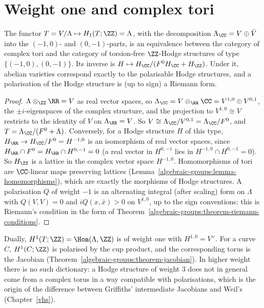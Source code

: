 \section{Weight one and complex tori}\label{hodge-structures:section-weight-one}

\begin{theorem}\label{hodge-structures:theorem-weight-one}
The functor $T = V/\Lambda \mapsto H_1(T; \ZZ) = \Lambda$, with the decomposition $\Lambda_\CC = V \oplus \bar V$ into the $(-1,0)$- and $(0,-1)$-parts, is an equivalence between the category
of complex tori and the category of torsion-free $\ZZ$-Hodge structures of type $\{(-1,0), (0,-1)\}$. Its inverse is $H \mapsto H_\CC/(F^0H_\CC + H_\ZZ)$. Under it, abelian varieties
correspond exactly to the polarisable Hodge structures, and a polarisation of the Hodge structure is (up to sign) a Riemann form.
\end{theorem}

\begin{proof}
$\Lambda \otimes_\ZZ\RR = V$ as real vector spaces, so $\Lambda_\CC = V \otimes_\RR\CC = V^{1,0} \oplus V^{0,1}$, the $\pm i$-eigenspaces of the complex structure, and the projection to $V^{1,0} \cong V$
restricts to the identity of $V$ on $\Lambda_\RR = V$. So $V \cong \Lambda_\CC/V^{0,1} = \Lambda_\CC/F^0$, and $T = \Lambda_\CC/(F^0 + \Lambda)$. Conversely, for a Hodge structure $H$ of this type,
$H_\RR \to H_\CC/F^0 = H^{-1,0}$ is an isomorphism of real vector spaces, since $H_\RR \cap F^0 = H_\RR \cap H^{0,-1} = 0$ (a real vector in $H^{0,-1}$ lies in $H^{-1,0} \cap H^{0,-1} = 0$). So $H_\ZZ$
is a lattice in the complex vector space $H^{-1,0}$. Homomorphisms of tori are $\CC$-linear maps preserving lattices (Lemma~\ref{algebraic-groups:lemma-homomorphisms}), which are exactly
the morphisms of Hodge structures. A polarisation $Q$ of weight $-1$ is an alternating integral (after scaling) form on $\Lambda$ with $Q(V, V) = 0$ and $iQ(x, \bar x) > 0$ on $V^{1,0}$, up to the
sign conventions; this is Riemann's condition in the form of Theorem~\ref{algebraic-groups:theorem-riemann-conditions}.
\end{proof}

\begin{remark}\label{hodge-structures:remark-weight-one-cohomology}
Dually, $H^1(T; \ZZ) = \Hom(\Lambda, \ZZ)$ is of weight one with $H^{1,0} = V^\vee$. For a curve $C$, $H^1(C; \ZZ)$ is polarised by the cup product, and the corresponding torus is the Jacobian
(Theorem~\ref{algebraic-groups:theorem-jacobian}). In higher weight there is no such dictionary: a Hodge structure of weight $3$ does not in general come from a complex torus in a way compatible
with polarisations, which is the origin of the difference between Griffiths' intermediate Jacobians and Weil's (Chapter~\ref{vhs}).
\end{remark}

